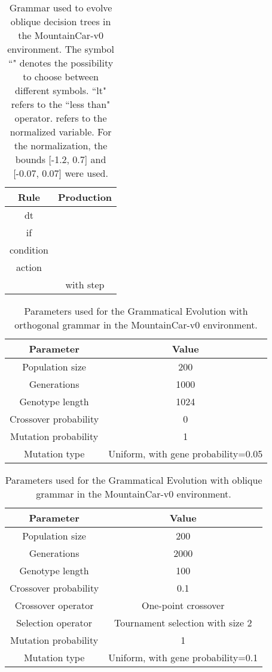\documentclass[review,english]{elsarticle}
\begin{document}
\begin{table}
    \centering
    \begin{tabular}{|c|c|} \hline
        \textbf{Rule} & \textbf{Production} \\ \hline
        dt &  \\ if &  \\ condition &  \\ action &  \\  &  with step  \\ \hline
    \end{tabular}
    \caption{Grammar used to evolve oblique decision trees in the MountainCar-v0 environment. The symbol ``" denotes the possibility to choose between different symbols. ``lt" refers to the ``less than" operator. 
     refers to the normalized  variable. For the normalization, the bounds [-1.2, 0.7] and [-0.07, 0.07] were used.}
    \label{tab:mc_obl_grammar}
\end{table}

\begin{table}
    \centering
    \begin{tabular}{|c|c|} \hline
        \textbf{Parameter} & \textbf{Value} \\ \hline
        Population size & 200 \\ Generations & 1000 \\ Genotype length & 1024 \\ Crossover probability & 0 \\ Mutation probability & 1 \\ Mutation type & Uniform, with gene probability=0.05 \\ \hline
    \end{tabular}
    \caption{Parameters used for the Grammatical Evolution with orthogonal grammar in the MountainCar-v0 environment.}
    \label{tab:mc_ort_params_ge}
\end{table}

\begin{table}
    \centering
    \begin{tabular}{|c|c|} \hline
        \textbf{Parameter} & \textbf{Value} \\ \hline
        Population size & 200 \\ Generations & 2000 \\ Genotype length & 100 \\ Crossover probability & 0.1 \\ Crossover operator & One-point crossover \\ Selection operator & Tournament selection with size 2 \\ Mutation probability & 1 \\ Mutation type & Uniform, with gene probability=0.1 \\ \hline
    \end{tabular}
    \caption{Parameters used for the Grammatical Evolution with oblique grammar in the MountainCar-v0 environment.}
    \label{tab:mc_obl_params_ge}
\end{table}
\end{document}
